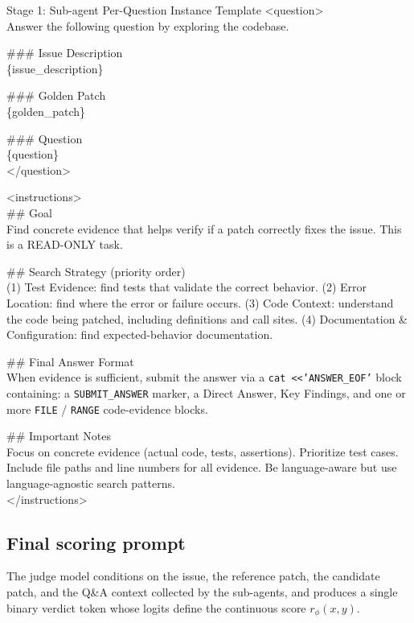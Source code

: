 \documentclass[]{arxiv_template}
\begin{document}
\begin{promptbox}{Stage 1: Sub-agent Per-Question Instance Template}
  \textless question\textgreater\\
  Answer the following question by exploring the codebase.

  \#\#\# Issue Description\\
  \{issue\_description\}

  \#\#\# Golden Patch\\
  \{golden\_patch\}

  \#\#\# Question\\
  \{question\}\\
  \textless /question\textgreater

  \textless instructions\textgreater\\
  \#\# Goal\\
  Find concrete evidence that helps verify if a patch correctly fixes the issue. This is a READ-ONLY task.

  \#\# Search Strategy (priority order)\\
  (1) Test Evidence: find tests that validate the correct behavior. (2) Error Location: find where the error or failure occurs. (3) Code Context: understand the code being patched, including definitions and call sites. (4) Documentation \& Configuration: find expected-behavior documentation.

  \#\# Final Answer Format\\
  When evidence is sufficient, submit the answer via a \texttt{cat \textless \textless 'ANSWER\_EOF'} block containing: a \texttt{SUBMIT\_ANSWER} marker, a Direct Answer, Key Findings, and one or more \texttt{FILE} / \texttt{RANGE} code-evidence blocks.

  \#\# Important Notes\\
  Focus on concrete evidence (actual code, tests, assertions). Prioritize test cases. Include file paths and line numbers for all evidence. Be language-aware but use language-agnostic search patterns.\\
  \textless /instructions\textgreater
\end{promptbox}

\subsection{Final scoring prompt}
\label{app:prompt-score}

The judge model conditions on the issue, the reference patch, the candidate patch, and the Q\&A context collected by the sub-agents, and produces a single binary verdict token whose logits define the continuous score $r_\phi(x, y)$.
\end{document}
